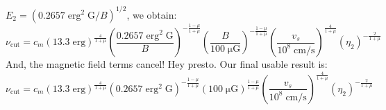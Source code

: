 \documentclass[iop, apj, numberedappendix]{emulateapj}
\newcommand*{\mt}{\mathrm}
\newcommand*{\unit}[1]{\;\mt{#1}}  %
\newcommand*{\muG}{\unit{\mu G}}
\begin{document}
$E_2 = \left( 0.2657 \unit{erg^2\;G} / B \right)^{1/2}$, we obtain:
\[
    \nu_{\mt{cut}} = c_m
        \left( 13.3 \unit{erg} \right)^{\frac{4}{1+\mu}}
        \left( \frac{0.2657 \unit{erg^2\;G}}{B} \right)^{-\frac{1-\mu}{1+\mu}}
        \left( \frac{B}{100\muG} \right)^{-\frac{1-\mu}{1+\mu}}
        \left( \frac{v_s}{10^8 \unit{cm/s}} \right)^{\frac{4}{1+\mu}}
        \left( \eta_2 \right)^{-\frac{2}{1+\mu}}
\]
And, the magnetic field terms cancel!  Hey presto.
Our final usable result is:
\begin{equation}
    \nu_{\mt{cut}} = c_m
        \left( 13.3 \unit{erg} \right)^{\frac{4}{1+\mu}}
        \left( 0.2657 \unit{erg^2\;G} \right)^{-\frac{1-\mu}{1+\mu}}
        \left( 100 \muG \right)^{\frac{1-\mu}{1+\mu}}
        \left( \frac{v_s}{10^8 \unit{cm/s}} \right)^{\frac{4}{1+\mu}}
        \left( \eta_2 \right)^{-\frac{2}{1+\mu}}
\end{equation}



\end{document}

